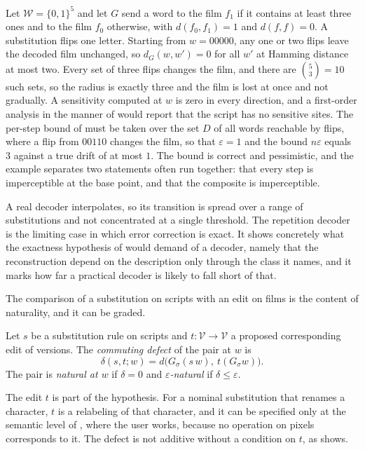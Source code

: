 \begin{example}\label{ex:repdecoder}
Let $\mathcal{W}=\{0,1\}^5$ and let $G$ send a word to the film $f_1$ if it contains at least three ones and to the film $f_0$ otherwise, with $d(f_0,f_1)=1$ and $d(f,f)=0$. A substitution flips one letter. Starting from $w=00000$, any one or two flips leave the decoded film unchanged, so $d_G(w,w')=0$ for all $w'$ at Hamming distance at most two. Every set of three flips changes the film, and there are $\binom{5}{3}=10$ such sets, so the radius is exactly three and the film is lost at once and not gradually. A sensitivity computed at $w$ is zero in every direction, and a first-order analysis in the manner of  would report that the script has no sensitive sites. The per-step bound of  must be taken over the set $D$ of all words reachable by flips, where a flip from $00110$ changes the film, so that $\varepsilon=1$ and the bound $n\varepsilon$ equals $3$ against a true drift of at most $1$. The bound is correct and pessimistic, and the example separates two statements often run together: that every step is imperceptible at the base point, and that the composite is imperceptible.
\end{example}

A real decoder interpolates, so its transition is spread over a range of substitutions and not concentrated at a single threshold. The repetition decoder is the limiting case in which error correction is exact. It shows concretely what the exactness hypothesis of  would demand of a decoder, namely that the reconstruction depend on the description only through the class it names, and it marks how far a practical decoder is likely to fall short of that.

The comparison of a substitution on scripts with an edit on films is the content of naturality, and it can be graded.

\begin{definition}\label{def:defect}
Let $s$ be a substitution rule on scripts and $t:\mathcal{V}\to\mathcal{V}$ a proposed corresponding edit of versions. The \emph{commuting defect} of the pair at $w$ is
\[
\delta(s,t;w)=d\bigl(G_\sigma(s\,w),\ t(G_\sigma w)\bigr).
\]
The pair is \emph{natural at $w$} if $\delta=0$ and \emph{$\varepsilon$-natural} if $\delta\le\varepsilon$.
\end{definition}

The edit $t$ is part of the hypothesis. For a nominal substitution that renames a character, $t$ is a relabeling of that character, and it can be specified only at the semantic level of , where the user works, because no operation on pixels corresponds to it. The defect is not additive without a condition on $t$, as  shows.

